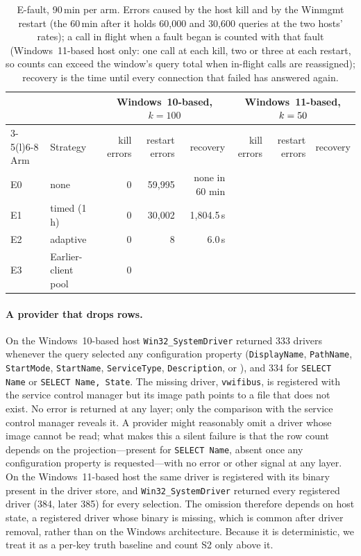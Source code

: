 \documentclass[letterpaper,twocolumn,10pt]{article}
\newcommand{\code}[1]{\texttt{\small #1}}
\begin{document}
\begin{table}[t]\centering\small
\caption{E-fault, 90\,min per arm. Errors caused by the host kill and by the Winmgmt restart (the 60\,min after it holds 60{,}000 and 30{,}600 queries at the two hosts' rates); a call in flight when a fault began is counted with that fault (Windows~11-based host only: one call at each kill, two or three at each restart, so counts can exceed the window's query total when in-flight calls are reassigned); recovery is the time until every connection that failed has answered again.}\label{tab:efault}
\begin{tabular}{@{}llrrrrrr@{}}\toprule
& & \multicolumn{3}{c}{Windows~10-based, $k=100$} & \multicolumn{3}{c}{Windows~11-based, $k=50{}$}\\\cmidrule(lr){3-5}\cmidrule(l){6-8}
Arm & Strategy & kill errors & restart errors & recovery & kill errors & restart errors & recovery\\\midrule
E0 & none & 0 & 59{,}995 & none in 60 min & \EbKill{} & \EbZeroErr{} & \EbZeroRec{}\\
E1 & timed (1\,h) & 0 & 30{,}002 & 1{,}804.5\,s & \EbKill{} & \EbOneErr{} & \EbOneRec{}\\
E2 & adaptive & 0 & 8 & 6.0\,s & \EbKill{} & \EbTwoErr{} & \EbTwoRec{}\\
E3 & Earlier-client pool & 0 & \EthreeErr{} & \EthreeRec{} & \EbKill{} & \EbThreeErr{} & \EbThreeRec{}\\\bottomrule
\end{tabular}
\end{table}

\paragraph{A provider that drops rows.}
On the Windows~10-based host \code{Win32\_SystemDriver} returned 333 drivers whenever the query selected any configuration property (\code{DisplayName}, \code{PathName}, \code{StartMode}, \code{StartName}, \code{ServiceType}, \code{Description}, or \code{*}), and 334 for \code{SELECT Name} or \code{SELECT Name, State}.
The missing driver, \code{vwifibus}, is registered with the service control manager but its image path points to a file that does not exist.
No error is returned at any layer; only the comparison with the service control manager reveals it.
A provider might reasonably omit a driver whose image cannot be read; what makes this a silent failure is that the row count depends on the projection---present for \code{SELECT Name}, absent once any configuration property is requested---with no error or other signal at any layer.
On the Windows~11-based host the same driver is registered with its binary present in the driver store, and \code{Win32\_SystemDriver} returned every registered driver (384, later 385) for every selection.
The omission therefore depends on host state, a registered driver whose binary is missing, which is common after driver removal, rather than on the Windows architecture.
Because it is deterministic, we treat it as a per-key truth baseline and count S2 only above it.
\end{document}
